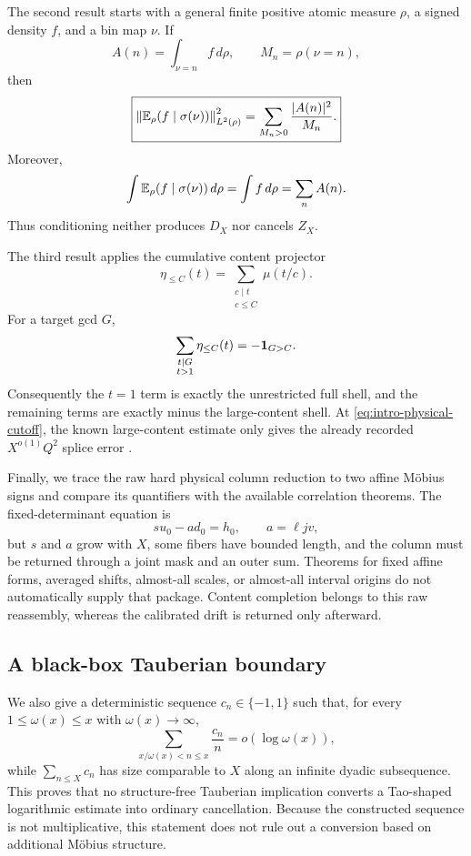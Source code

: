 The second result starts with a general finite positive atomic measure
\(\rho\), a signed density \(f\), and a bin map \(\nu\).  If
\[
 A(n)=\int_{\nu=n}f\,d\rho,\qquad
 M_n=\rho(\nu=n),
\]
then
\begin{equation}
 \boxed{
 \left\|\mathbb E_\rho(f\mid\sigma(\nu))\right\|_{L^2(\rho)}^2
 =\sum_{M_n>0}\frac{|A(n)|^2}{M_n}.}
 \label{eq:intro-conditional-energy}
\end{equation}
Moreover,
\[
 \int\mathbb E_\rho(f\mid\sigma(\nu))\,d\rho
 =\int f\,d\rho
 =\sum_nA(n).
\]
Thus conditioning neither produces \(D_X\) nor cancels \(Z_X\).

The third result applies the cumulative content projector
\[
 \eta_{\le C}(t)
 =\sum_{\substack{c\mid t\\c\le C}}\mu(t/c).
\]
For a target gcd \(G\),
\[
 \sum_{\substack{t\mid G\\t>1}}\eta_{\le C}(t)
 =-\mathbf 1_{G>C}.
\]
Consequently the \(t=1\) term is exactly the unrestricted full shell,
and the remaining terms are exactly minus the large-content shell.
At \eqref{eq:intro-physical-cutoff}, the known large-content estimate
only gives the already recorded \(X^{o(1)}Q^2\) splice error
\citep{WangTPC30,WangTPC32}.

Finally, we trace the raw hard physical column reduction to two affine
M\"obius signs and compare its quantifiers with the available
correlation theorems.  The fixed-determinant equation is
\[
 su_0-ad_0=h_0,\qquad a=\ell jv,
\]
but \(s\) and \(a\) grow with \(X\), some fibers have bounded length,
and the column must be returned through a joint mask and an outer
sum.  Theorems for fixed affine forms, averaged shifts, almost-all
scales, or almost-all interval origins do not automatically supply
that package.  Content completion belongs to this raw reassembly,
whereas the calibrated drift is returned only afterward.

\subsection{A black-box Tauberian boundary}

We also give a deterministic sequence \(c_n\in\{-1,1\}\) such that,
for every \(1\le\omega(x)\le x\) with \(\omega(x)\to\infty\),
\[
 \sum_{x/\omega(x)<n\le x}\frac{c_n}{n}
 =o(\log\omega(x)),
\]
while \(\sum_{n\le X}c_n\) has size comparable to \(X\) along an
infinite dyadic subsequence.  This proves that no structure-free
Tauberian implication converts a Tao-shaped logarithmic estimate into
ordinary cancellation.  Because the constructed sequence is not
multiplicative, this statement does not rule out a conversion based
on additional M\"obius structure.

